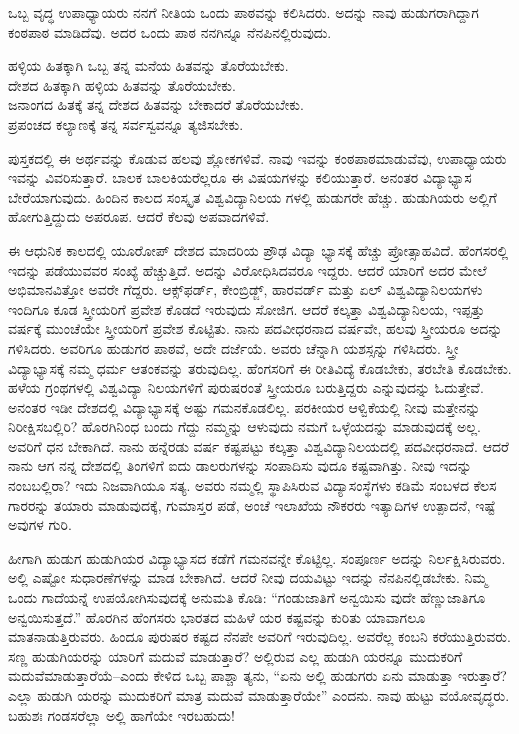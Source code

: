ಒಬ್ಬ ವೃದ್ಧ ಉಪಾಧ್ಯಾಯರು ನನಗೆ ನೀತಿಯ ಒಂದು ಪಾಠವನ್ನು ಕಲಿಸಿದರು. ಅದನ್ನು ನಾವು ಹುಡುಗರಾಗಿದ್ದಾಗ ಕಂಠಪಾಠ ಮಾಡಿದೆವು. ಅದರ ಒಂದು ಪಾಠ ನನಗಿನ್ನೂ ನೆನಪಿನಲ್ಲಿರುವುದು.

\begin{myquote}
ಹಳ್ಳಿಯ ಹಿತಕ್ಕಾಗಿ ಒಬ್ಬ ತನ್ನ ಮನೆಯ ಹಿತವನ್ನು ತೊರೆಯಬೇಕು.\\ದೇಶದ ಹಿತಕ್ಕಾಗಿ ಹಳ್ಳಿಯ ಹಿತವನ್ನು ತೊರೆಯಬೇಕು.\\ಜನಾಂಗದ ಹಿತಕ್ಕೆ ತನ್ನ ದೇಶದ ಹಿತವನ್ನು ಬೇಕಾದರೆ ತೊರೆಯಬೇಕು.\\ಪ್ರಪಂಚದ ಕಲ್ಯಾಣಕ್ಕೆ ತನ್ನ ಸರ್ವಸ್ವವನ್ನೂ ತ್ಯಜಿಸಬೇಕು.
\end{myquote}

ಪುಸ್ತಕದಲ್ಲಿ ಈ ಅರ್ಥವನ್ನು ಕೊಡುವ ಹಲವು ಶ್ಲೋಕಗಳಿವೆ. ನಾವು ಇವನ್ನು ಕಂಠಪಾಠಮಾಡುವೆವು, ಉಪಾಧ್ಯಾಯರು ಇವನ್ನು ವಿವರಿಸುತ್ತಾರೆ. ಬಾಲಕ ಬಾಲಕಿಯರೆಲ್ಲರೂ ಈ ವಿಷಯಗಳನ್ನು ಕಲಿಯುತ್ತಾರೆ. ಅನಂತರ ವಿದ್ಯಾಭ್ಯಾಸ ಬೇರೆಯಾಗುವುದು. ಹಿಂದಿನ ಕಾಲದ ಸಂಸ್ಕೃತ ವಿಶ್ವವಿದ್ಯಾನಿಲಯ ಗಳಲ್ಲಿ ಹುಡುಗರೇ ಹೆಚ್ಚು. ಹುಡುಗಿಯರು ಅಲ್ಲಿಗೆ ಹೋಗುತ್ತಿದ್ದುದು ಅಪರೂಪ. ಆದರೆ ಕೆಲವು ಅಪವಾದಗಳಿವೆ.

ಈ ಆಧುನಿಕ ಕಾಲದಲ್ಲಿ ಯೂರೋಪ್​ ದೇಶದ ಮಾದರಿಯ ಪ್ರೌಢ ವಿದ್ಯಾ ಭ್ಯಾಸಕ್ಕೆ ಹೆಚ್ಚು ಪ್ರೋತ್ಸಾಹವಿದೆ. ಹೆಂಗಸರಲ್ಲಿ ಇದನ್ನು ಪಡೆಯುವವರ ಸಂಖ್ಯೆ ಹೆಚ್ಚುತ್ತಿದೆ. ಅದನ್ನು ವಿರೋಧಿಸಿದವರೂ ಇದ್ದರು. ಆದರೆ ಯಾರಿಗೆ ಅದರ ಮೇಲೆ ಅಭಿಮಾನವಿತ್ತೋ ಅವರೇ ಗೆದ್ದರು. ಆಕ್ಸ್​ಫರ್ಡ್​, ಕೇಂಬ್ರಿಡ್ಜ್​, ಹಾರವರ್ಡ್​ ಮತ್ತು ಏಲ್​ ವಿಶ್ವವಿದ್ಯಾನಿಲಯಗಳು ಇಂದಿಗೂ ಕೂಡ ಸ್ತ್ರೀಯರಿಗೆ ಪ್ರವೇಶ ಕೊಡದೆ ಇರುವುದು ಸೋಜಿಗ. ಆದರೆ ಕಲ್ಕತ್ತಾ ವಿಶ್ವವಿದ್ಯಾನಿಲಯ, ಇಪ್ಪತ್ತು ವರ್ಷಕ್ಕೆ ಮುಂಚೆಯೇ ಸ್ತ್ರೀಯರಿಗೆ ಪ್ರವೇಶ ಕೊಟ್ಟಿತು. ನಾನು ಪದವೀಧರನಾದ ವರ್ಷವೇ, ಹಲವು ಸ್ತ್ರೀಯರೂ ಅದನ್ನು ಗಳಿಸಿದರು. ಅವರಿಗೂ ಹುಡುಗರ ಪಾಠವೆ, ಅದೇ ದರ್ಜೆಯೆ. ಅವರು ಚೆನ್ನಾಗಿ ಯಶಸ್ಸನ್ನು ಗಳಿಸಿದರು. ಸ್ತ್ರೀ ವಿದ್ಯಾಭ್ಯಾಸಕ್ಕೆ ನಮ್ಮ ಧರ್ಮ ಆತಂಕವನ್ನು ತರುವುದಿಲ್ಲ. ಹೆಂಗಸರಿಗೆ ಈ ರೀತಿವಿದ್ಯೆ ಕೊಡಬೇಕು, ತರಬೇತಿ ಕೊಡಬೇಕು. ಹಳೆಯ ಗ್ರಂಥಗಳಲ್ಲಿ ವಿಶ್ವವಿದ್ಯಾ ನಿಲಯಗಳಿಗೆ ಪುರುಷರಂತೆ ಸ್ತ್ರೀಯರೂ ಬರುತ್ತಿದ್ದರು ಎನ್ನುವುದನ್ನು ಓದುತ್ತೇವೆ. ಅನಂತರ ಇಡೀ ದೇಶದಲ್ಲಿ ವಿದ್ಯಾಭ್ಯಾಸಕ್ಕೆ ಅಷ್ಟು ಗಮನಕೊಡಲಿಲ್ಲ. ಪರಕೀಯರ ಆಳ್ವಿಕೆಯಲ್ಲಿ ನೀವು ಮತ್ತೇನನ್ನು ನಿರೀಕ್ಷಿಸಬಲ್ಲಿರಿ? ಹೊರಗಿನಿಂಧ ಬಂದು ಗೆದ್ದು ನಮ್ಮನ್ನು ಆಳುವುದು ನಮಗೆ ಒಳ್ಳೆಯದನ್ನು ಮಾಡುವುದಕ್ಕೆ ಅಲ್ಲ. ಅವರಿಗೆ ಧನ ಬೇಕಾಗಿದೆ. ನಾನು ಹನ್ನೆರಡು ವರ್ಷ ಕಷ್ಟಪಟ್ಟು ಕಲ್ಕತ್ತಾ ವಿಶ್ವವಿದ್ಯಾನಿಲಯದಲ್ಲಿ ಪದವೀಧರನಾದೆ. ಆದರೆ ನಾನು ಆಗ ನನ್ನ ದೇಶದಲ್ಲಿ ತಿಂಗಳಿಗೆ ಐದು ಡಾಲರುಗಳನ್ನು ಸಂಪಾದಿಸು ವುದೂ ಕಷ್ಟವಾಗಿತ್ತು. ನೀವು ಇದನ್ನು ನಂಬಬಲ್ಲಿರಾ? ಇದು ನಿಜವಾಗಿಯೂ ಸತ್ಯ. ಅವರು ನಮ್ಮಲ್ಲಿ ಸ್ಥಾಪಿಸಿರುವ ವಿದ್ಯಾಸಂಸ್ಥೆಗಳು ಕಡಿಮೆ ಸಂಬಳದ ಕೆಲಸ ಗಾರರನ್ನು ತಯಾರು ಮಾಡುವುದಕ್ಕೆ, ಗುಮಾಸ್ತರ ಪಡೆ, ಅಂಚೆ ಇಲಾಖೆಯ ನೌಕರರು ಇತ್ಯಾದಿಗಳ ಉತ್ಪಾದನೆ, ಇಷ್ಟೆ ಅವುಗಳ ಗುರಿ.

ಹೀಗಾಗಿ ಹುಡುಗ ಹುಡುಗಿಯರ ವಿದ್ಯಾಭ್ಯಾಸದ ಕಡೆಗೆ ಗಮನವನ್ನೇ ಕೊಟ್ಟಿಲ್ಲ. ಸಂಪೂರ್ಣ ಅದನ್ನು ನಿರ್ಲಕ್ಷಿಸಿರುವರು. ಅಲ್ಲಿ ಎಷ್ಟೋ ಸುಧಾರಣೆಗಳನ್ನು ಮಾಡ ಬೇಕಾಗಿದೆ. ಆದರೆ ನೀವು ದಯವಿಟ್ಟು ಇದನ್ನು ನೆನಪಿನಲ್ಲಿಡಬೇಕು. ನಿಮ್ಮ ಒಂದು ಗಾದೆಯನ್ನೆ ಉಪಯೋಗಿಸುವುದಕ್ಕೆ ಅನುಮತಿ ಕೊಡಿ: “ಗಂಡುಜಾತಿಗೆ ಅನ್ವಯಿಸು ವುದೇ ಹೆಣ್ಣುಜಾತಿಗೂ ಅನ್ವಯಿಸುತ್ತದೆ.” ಹೊರಗಿನ ಹೆಂಗಸರು ಭಾರತದ ಮಹಿಳೆ ಯರ ಕಷ್ಟವನ್ನು ಕುರಿತು ಯಾವಾಗಲೂ ಮಾತನಾಡುತ್ತಿರುವರು. ಹಿಂದೂ ಪುರುಷರ ಕಷ್ಟದ ನೆನಪೇ ಅವರಿಗೆ ಇರುವುದಿಲ್ಲ. ಅವರೆಲ್ಲ ಕಂಬನಿ ಕರೆಯುತ್ತಿರುವರು. ಸಣ್ಣ ಹುಡುಗಿಯರನ್ನು ಯಾರಿಗೆ ಮದುವೆ ಮಾಡುತ್ತಾರೆ? ಅಲ್ಲಿರುವ ಎಲ್ಲ ಹುಡುಗಿ ಯರನ್ನೂ ಮುದುಕರಿಗೆ ಮದುವೆಮಾಡುತ್ತಾರೆಯೆ–ಎಂದು ಕೇಳಿದ ಒಬ್ಬ ಪಾಶ್ಚಾ ತ್ಯನು, “ಏನು ಅಲ್ಲಿ ಹುಡುಗರು ಏನು ಮಾಡುತ್ತಾ ಇರುತ್ತಾರೆ? ಎಲ್ಲಾ ಹುಡುಗಿ ಯರನ್ನು ಮುದುಕರಿಗೆ ಮಾತ್ರ ಮದುವೆ ಮಾಡುತ್ತಾರೆಯೇ” ಎಂದನು. ನಾವು ಹುಟ್ಟು ವಯೋವೃದ್ಧರು. ಬಹುಶಃ ಗಂಡಸರೆಲ್ಲಾ ಅಲ್ಲಿ ಹಾಗೆಯೇ ಇರಬಹುದು!

